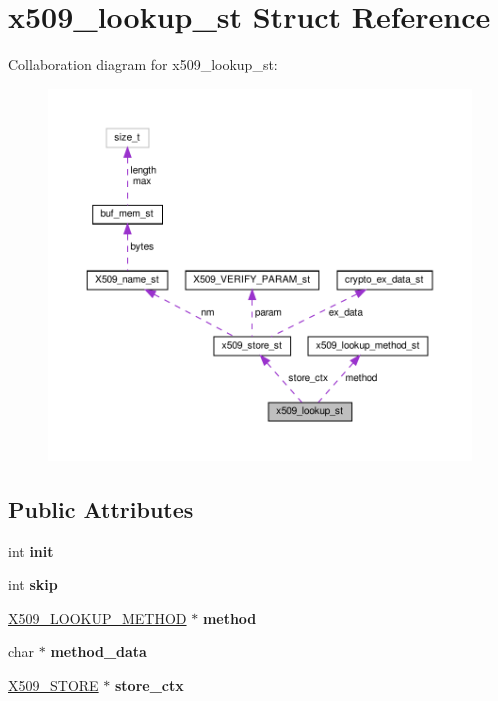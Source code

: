 \hypertarget{structx509__lookup__st}{}\section{x509\+\_\+lookup\+\_\+st Struct Reference}
\label{structx509__lookup__st}


Collaboration diagram for x509\+\_\+lookup\+\_\+st\+:
\nopagebreak
\begin{figure}[H]
\begin{center}
\leavevmode
\includegraphics[width=350pt]{structx509__lookup__st__coll__graph}
\end{center}
\end{figure}
\subsection*{Public Attributes}
\begin{DoxyCompactItemize}
\item 
\mbox{\label{structx509__lookup__st_a63b25b8fcf160eac9348b88e48eab9c1}} 
int {\bfseries init}
\item 
\mbox{\label{structx509__lookup__st_a8d1184cdc9e7f7c4d081a32df8b78a97}} 
int {\bfseries skip}
\item 
\mbox{\label{structx509__lookup__st_a84bf6103b3374899e01401931ee30eda}} 
\hyperlink{structx509__lookup__method__st}{X509\+\_\+\+L\+O\+O\+K\+U\+P\+\_\+\+M\+E\+T\+H\+OD} $\ast$ {\bfseries method}
\item 
\mbox{\label{structx509__lookup__st_a63bfeed761e0dd16a8fe59d6a3933cb4}} 
char $\ast$ {\bfseries method\+\_\+data}
\item 
\mbox{\label{structx509__lookup__st_a91fff2cdf32522eb0b037bdb9cdf2e53}} 
\hyperlink{structx509__store__st}{X509\+\_\+\+S\+T\+O\+RE} $\ast$ {\bfseries store\+\_\+ctx}
\end{DoxyCompactItemize}


